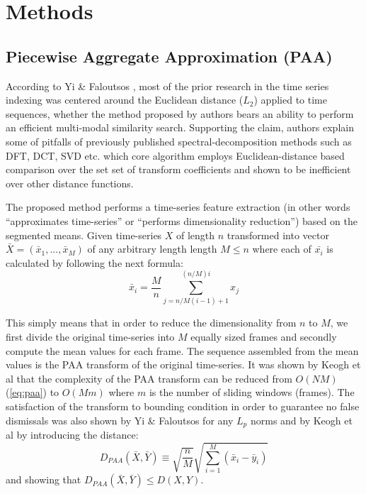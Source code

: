 \chapter{Methods}

\section{Piecewise Aggregate Approximation (PAA)}
According to Yi \& Faloutsos \cite{citeulike:2946589}, most of the prior research in the time series indexing was centered around the Euclidean distance ($L_{2}$) applied to time sequences, whether the method proposed by authors bears an ability to perform an efficient multi-modal similarity search. Supporting the claim, authors explain some of pitfalls of previously published spectral-decomposition methods such as DFT, DCT, SVD etc. which core algorithm employs Euclidean-distance based comparison over the set set of transform coefficients and shown to be inefficient over other distance functions.

The proposed method performs a time-series feature extraction (in other words ``approximates time-series'' or ``performs dimensionality reduction'') based on the segmented means. Given time-series $X$ of length $n$ transformed into vector $\bar{X} = ( \bar{x}_{1}, ..., \bar{x}_{M} )$ of any arbitrary length length $M \leq n$ where each of $\bar{x_{i}}$ is calculated by following the next formula:
\begin{equation}
\bar{x}_{i} = \frac{M}{n} \sum_{j=n/M(i-1)+1}^{(n/M)i} x_{j}
\label{eq:paa}
\end{equation}

This simply means that in order to reduce the dimensionality from $n$ to $M$, we first divide the original time-series into $M$ equally sized frames and secondly compute the mean values for each frame. The sequence assembled from the mean values is the PAA transform of the original time-series. It was shown by Keogh et al that the complexity of the PAA transform can be reduced from $O(NM)$ (\ref{eq:paa}) to $O(Mm)$ where $m$ is the number of sliding windows (frames). The satisfaction of the transform to bounding condition in order to guarantee no false dismissals was also shown by Yi \& Faloutsos for any $L_{p}$ norms and by Keogh et al \cite{citeulike:3000416} by introducing the distance:
\begin{equation}
D_{PAA}(\bar{X}, \bar{Y}) \equiv \sqrt{\frac{n}{M}} \sqrt{ \sum_{i=1}^{M} 
\left(  \bar{x}_{i} - \bar{y}_{i} \right)}
\label{eq:paa_distnace}
\end{equation}
and showing that $D_{PAA}(\bar{X}, \bar{Y}) \leq D(X,Y)$.


